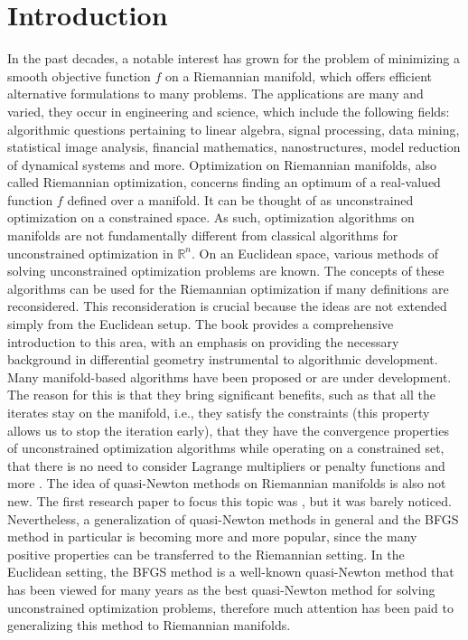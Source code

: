 \chapter{Introduction}

In the past decades, a notable interest has grown for the problem of minimizing a smooth objective function $f$ on a Riemannian manifold, which offers efficient alternative formulations to many problems. The applications are many and varied, they occur in engineering and science, which include the following fields: algorithmic questions pertaining to linear algebra, signal processing, data mining, statistical image analysis, financial mathematics, nanostructures, model reduction of dynamical systems and more. Optimization on Riemannian manifolds, also called Riemannian optimization, concerns finding an optimum of a real-valued function $f$ defined over a manifold. It can be thought of as unconstrained optimization on a constrained space. As such, optimization algorithms on manifolds are not fundamentally different from classical algorithms for unconstrained optimization in $\mathbb{R}^n$. On an Euclidean space, various methods of solving unconstrained optimization problems are known. The concepts of these algorithms can be used for the Riemannian optimization if many definitions are reconsidered. This reconsideration is crucial because the ideas are not extended simply from the Euclidean setup. The book \cite{AbsilMahonySepulchre:2008} provides a comprehensive introduction to this area, with an emphasis on providing the necessary background in differential geometry instrumental to algorithmic development. \\
Many manifold-based algorithms have been proposed or are under development. The reason for this is that they bring significant benefits, such as that all the iterates stay on the manifold, i.e., they satisfy the constraints (this property allows us to stop the iteration early), that they have the convergence properties of unconstrained optimization algorithms while operating on a constrained set, that there is no need to consider Lagrange multipliers or penalty functions and more \cite[p.~2-3]{Huang:2013}. The idea of quasi-Newton methods on Riemannian manifolds is also not new. The first research paper to focus this topic was \cite{Gabay:1982}, but it was barely noticed. Nevertheless, a generalization of quasi-Newton methods in general and the BFGS method in particular is becoming more and more popular, since the many positive properties can be transferred to the Riemannian setting. In the Euclidean setting, the BFGS method is a well-known quasi-Newton method that has been viewed for many years as the best quasi-Newton method for solving unconstrained optimization problems, therefore much attention has been paid to generalizing this method to Riemannian manifolds. \\
